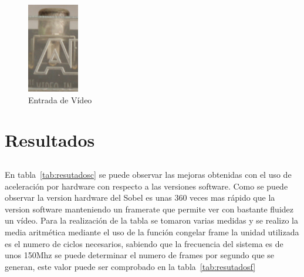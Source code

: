 \documentclass[a4paper,12pt,titlepage,final]{book}
\begin{document}
\begin{figure}[p]
\centering
\includegraphics[width=0.20\textwidth]{./figuras/NEEK/VIN.png}
\caption{Entrada de Vídeo}
\label{fig:VIN}
\end{figure}

\clearpage
\section{Resultados}
\subsection*{}
\subsubsection*{}
\paragraph{}
En tabla~\ref{tab:resutadosc} se puede observar las mejoras obtenidas con el uso de aceleración por hardware con respecto a las versiones software. Como se puede observar la version hardware del Sobel es unas 360 veces mas rápido que la version software manteniendo un framerate que permite ver con bastante fluidez un vídeo. Para la realización de la tabla se tomaron varias medidas y se realizo la media aritmética mediante el uso de la función congelar frame la unidad utilizada es el numero de ciclos necesarios, sabiendo que la frecuencia del sistema es de unos 150Mhz se puede determinar el numero de frames por segundo que se generan, este valor puede ser comprobado en la tabla~\ref{tab:resutadosf}
\end{document}
